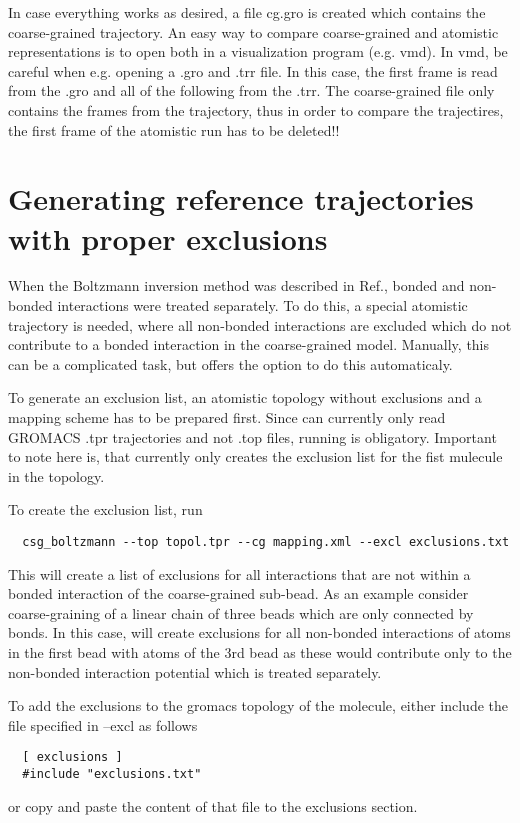 In case everything works as desired, a file cg.gro is created which contains the coarse-grained trajectory. An easy way to compare coarse-grained and atomistic representations is to open both in a visualization program (e.g. vmd).  In vmd, be careful when e.g. opening a .gro and .trr file. In this case, the first frame is read from the .gro and all of the following from the .trr. The coarse-grained file only contains the frames from the trajectory, thus in order to compare the trajectires, the first frame of the atomistic run has to be deleted!!

\section{Generating reference trajectories with proper exclusions}
When the Boltzmann inversion method was described in Ref.\cite{Tschoep:1998}, bonded and non-bonded interactions were treated separately. To do this, a special atomistic trajectory is needed, where all non-bonded interactions are excluded which do not contribute to a bonded interaction in the coarse-grained model. Manually, this can be a complicated task, but  offers the option  to do this automaticaly.

To generate an exclusion list, an atomistic topology without exclusions and a mapping scheme has to be prepared first. Since \votca can currently only read GROMACS .tpr trajectories and not .top files, running  is obligatory. Important to note here is, that  currently only creates the exclusion list for the fist mulecule in the topology.

To create the exclusion list, run
\begin{verbatim}
  csg_boltzmann --top topol.tpr --cg mapping.xml --excl exclusions.txt
\end{verbatim}
This will create a list of exclusions for all interactions that are not within a bonded interaction of the coarse-grained sub-bead. As an example consider coarse-graining of a linear chain of three beads  which are only connected by bonds. In this case,  will create exclusions for all non-bonded interactions of atoms in the first bead with atoms of the 3rd bead as these would contribute only to the non-bonded interaction potential which is treated separately.

To add the exclusions to the gromacs topology of the molecule, either include the file specified in --excl as follows
\begin{verbatim}
  [ exclusions ]
  #include "exclusions.txt"
\end{verbatim}
or copy and paste the content of that file to the exclusions section.


